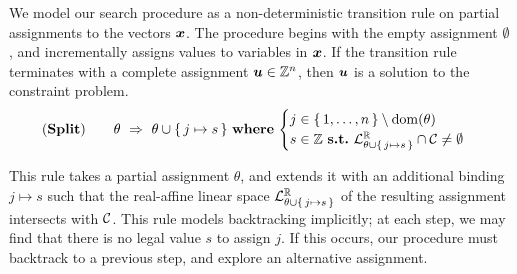 \newcommand{\ruleref}{\textbf{Split}}

We model our search procedure as a non-deterministic transition rule on partial
assignments to the vectors $\boldsymbol{x}$.  The procedure begins with the empty
assignment $\emptyset$, and incrementally assigns values to variables in $\boldsymbol{x}$.
If the transition rule terminates with a complete assignment
$\boldsymbol{u} \in \mathbb{Z}^n$, then $\boldsymbol{u}$ is a solution to the constraint
problem.
%
\begin{equation}
\mathbf{(Split)}
\hspace{20pt} \theta \ \Rightarrow \ \theta \cup \{\,j \mapsto s\,\}
   \ \textbf{where}\,\begin{cases}
      j \in \{\,1, \ldots, n\,\} \setminus \mathrm{dom}(\theta)\\
      s \in \mathbb{Z}\ \textbf{s.t.}
      \ \mathcal{L}^{\mathbb{R}}_{\theta \cup \{\,j \mapsto s\,\}} \cap \mathcal{C} \neq \emptyset
      \end{cases}
\end{equation}

This rule takes a partial assignment $\theta$, and extends it with an additional
binding $j \mapsto s$ such that the real-affine linear space
$\mathcal{L}^{\mathbb{R}}_{\theta \cup \{\,j \mapsto s\,\}}$ of the resulting assignment
intersects with $\mathcal{C}$.  This rule models backtracking implicitly; at each
step, we may find that there is no legal value $s$ to assign $j$.  If this
occurs, our procedure must backtrack to a previous step, and explore an
alternative assignment.

